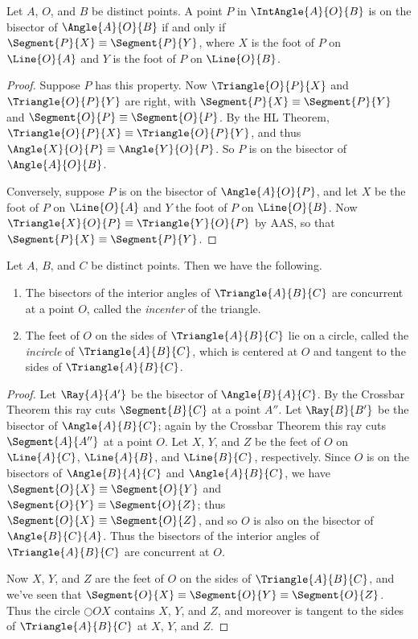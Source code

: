 \documentclass{article}
\begin{document}

\begin{prop}
Let $A$, $O$, and $B$ be distinct points. A point $P$ in $\IntAngle{A}{O}{B}$ is on the bisector of $\Angle{A}{O}{B}$ if and only if $\Segment{P}{X} \equiv \Segment{P}{Y}$, where $X$ is the foot of $P$ on $\Line{O}{A}$ and $Y$ is the foot of $P$ on $\Line{O}{B}$.
\end{prop}

\begin{proof}
Suppose $P$ has this property. Now $\Triangle{O}{P}{X}$ and $\Triangle{O}{P}{Y}$ are right, with $\Segment{P}{X} \equiv \Segment{P}{Y}$ and $\Segment{O}{P} \equiv \Segment{O}{P}$. By the HL Theorem, $\Triangle{O}{P}{X} \equiv \Triangle{O}{P}{Y}$, and thus $\Angle{X}{O}{P} \equiv \Angle{Y}{O}{P}$. So $P$ is on the bisector of $\Angle{A}{O}{B}$.

Conversely, suppose $P$ is on the bisector of $\Angle{A}{O}{P}$, and let $X$ be the foot of $P$ on $\Line{O}{A}$ and $Y$ the foot of $P$ on $\Line{O}{B}$. Now $\Triangle{X}{O}{P} \equiv \Triangle{Y}{O}{P}$ by AAS, so that $\Segment{P}{X} \equiv \Segment{P}{Y}$. 
\end{proof}

\begin{construct}
Let $A$, $B$, and $C$ be distinct points. Then we have the following.
\begin{enumerate}
\item The bisectors of the interior angles of $\Triangle{A}{B}{C}$ are concurrent at a point $O$, called the \emph{incenter} of the triangle.

\item The feet of $O$ on the sides of $\Triangle{A}{B}{C}$ lie on a circle, called the \emph{incircle} of $\Triangle{A}{B}{C}$, which is centered at $O$ and tangent to the sides of $\Triangle{A}{B}{C}$.
\end{enumerate}
\end{construct}

\begin{proof}
Let $\Ray{A}{A'}$ be the bisector of $\Angle{B}{A}{C}$. By the Crossbar Theorem this ray cuts $\Segment{B}{C}$ at a point $A''$. Let $\Ray{B}{B'}$ be the bisector of $\Angle{A}{B}{C}$; again by the Crossbar Theorem this ray cuts $\Segment{A}{A''}$ at a point $O$. Let $X$, $Y$, and $Z$ be the feet of $O$ on $\Line{A}{C}$, $\Line{A}{B}$, and $\Line{B}{C}$, respectively. Since $O$ is on the bisectors of $\Angle{B}{A}{C}$ and $\Angle{A}{B}{C}$, we have $\Segment{O}{X} \equiv \Segment{O}{Y}$ and $\Segment{O}{Y} \equiv \Segment{O}{Z}$; thus $\Segment{O}{X} \equiv \Segment{O}{Z}$, and so $O$ is also on the bisector of $\Angle{B}{C}{A}$. Thus the bisectors of the interior angles of $\Triangle{A}{B}{C}$ are concurrent at $O$.

Now $X$, $Y$, and $Z$ are the feet of $O$ on the sides of $\Triangle{A}{B}{C}$, and we've seen that $\Segment{O}{X} \equiv \Segment{O}{Y} \equiv \Segment{O}{Z}$. Thus the circle $\Circle{O}{X}$ contains $X$, $Y$, and $Z$, and moreover is tangent to the sides of $\Triangle{A}{B}{C}$ at $X$, $Y$, and $Z$.
\end{proof}
\end{document}
